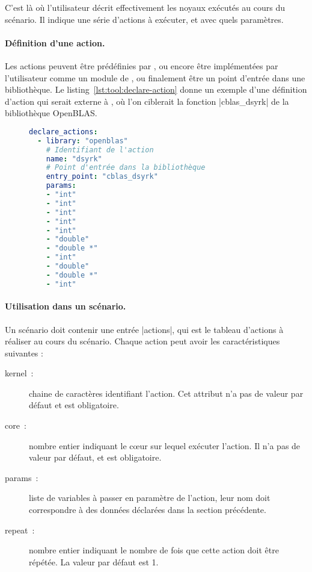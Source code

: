 C'est là où l'utilisateur décrit effectivement les noyaux exécutés au cours du scénario.
Il indique une série d'actions à exécuter, et avec quels paramètres.

\paragraph{Définition d'une action.}

Les actions peuvent être prédéfinies par \outil, ou encore être implémentées par l'utilisateur comme un module de \outil, ou finalement être un point d'entrée dans une bibliothèque.
Le listing~\ref{lst:tool:declare-action} donne un exemple d'une définition d'action qui serait externe à \outil, où l'on ciblerait la fonction |cblas_dsyrk| de la bibliothèque OpenBLAS.

\begin{figure}[h!]
\begin{lstlisting}[language=yaml,caption=Exemple de définition d'une action externe,label=lst:tool:declare-action]
declare_actions:
  - library: "openblas"
    # Identifiant de l'action
    name: "dsyrk"
    # Point d'entrée dans la bibliothèque
    entry_point: "cblas_dsyrk"
    params:
    - "int"
    - "int"
    - "int"
    - "int"
    - "int"
    - "double"
    - "double *"
    - "int"
    - "double"
    - "double *"
    - "int"
\end{lstlisting}
\end{figure}

\paragraph{Utilisation dans un scénario.}

Un scénario doit contenir une entrée |actions|, qui est le tableau d'actions à réaliser au cours du scénario.
Chaque action peut avoir les caractéristiques suivantes :
\begin{description}
  \item [kernel~:] chaine de caractères identifiant l'action.
    Cet attribut n'a pas de valeur par défaut et est obligatoire.
  \item [core~:] nombre entier indiquant le cœur sur lequel exécuter l'action. Il n'a pas de valeur par défaut, et est obligatoire.
  \item [params~:] liste de variables à passer en paramètre de l'action, leur nom doit correspondre à des données déclarées dans la section précédente.
  \item [repeat~:] nombre entier indiquant le nombre de fois que cette action doit être répétée. La valeur par défaut est 1.
\end{description}

